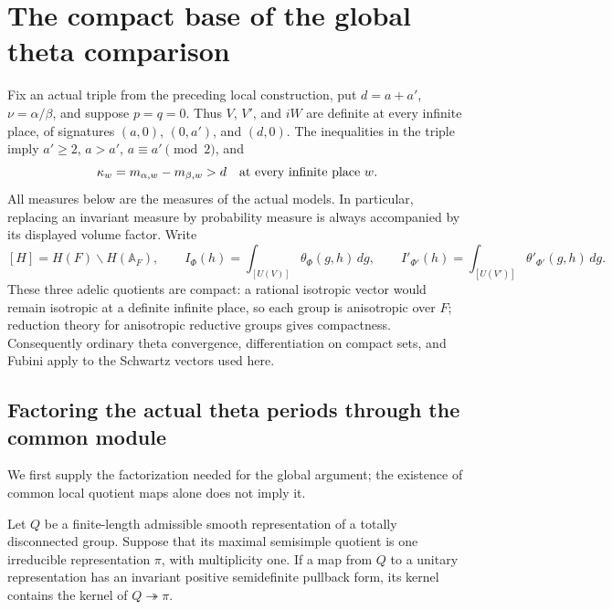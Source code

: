 \section{The compact base of the global theta comparison}
\label{sec:sr-compact-global-comparison}

Fix an actual triple from the preceding local construction, put
\(d=a+a'\), \(\nu=\alpha/\beta\), and suppose \(p=q=0\).
Thus \(V\), \(V'\), and \(iW\) are definite at every infinite
place, of signatures \((a,0)\), \((0,a')\), and \((d,0)\).
The inequalities in the triple imply \(a'\geq2\), \(a>a'\),
\(a\equiv a'\pmod2\), and
\[
       \kappa_w=m_{\alpha,w}-m_{\beta,w}>d
                  \quad\hbox{at every infinite place }w.
\]
All measures below are the measures of the actual models.
In particular, replacing an invariant measure by probability
measure is always accompanied by its displayed volume factor.
Write
\[
 [H]=H(F)\backslash H(\mathbb A_F),\qquad
 I_\Phi(h)=\int_{[U(V)]}\theta_\Phi(g,h)\,dg,\qquad
 I'_{\Phi'}(h)=\int_{[U(V')]}\theta'_{\Phi'}(g,h)\,dg.
\]
These three adelic quotients are compact: a rational isotropic
vector would remain isotropic at a definite infinite place,
so each group is anisotropic over \(F\); reduction theory for
anisotropic reductive groups gives compactness. Consequently
ordinary theta convergence, differentiation on compact sets,
and Fubini apply to the Schwartz vectors used here.

\subsection{Factoring the actual theta periods through the common module}

We first supply the factorization needed for the global argument;
the existence of common local quotient maps alone does not imply it.

\begin{srlemma}
Let \(Q\) be a finite-length admissible smooth representation of
a totally disconnected group. Suppose that its maximal semisimple
quotient is one irreducible representation \(\pi\), with
multiplicity one. If a map from \(Q\) to a unitary representation
has an invariant positive semidefinite pullback form, its kernel
contains the kernel of \(Q\twoheadrightarrow\pi\).
\end{srlemma}

